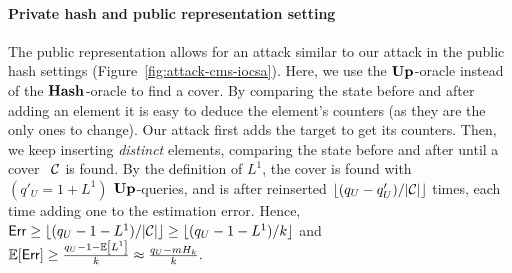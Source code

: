 \paragraph{Private hash and public representation setting}
The public representation allows for an attack similar to our attack in the public hash settings (Figure~\ref{fig:attack-cms-iocsa}). Here, we use the $\textup{\textbf{Up}}\hspace{0.5pt}$-oracle instead of the $\textup{\textbf{Hash}}\hspace{0.5pt}$-oracle to find a cover. By comparing the state before and after adding an element 
it is easy to deduce the element's counters (as they are the only ones to change).
Our attack first adds the target to get its counters. Then, we keep inserting \textit{distinct} elements, comparing the state before and after until a cover ~$\mathcal{C}$ is found.
By the definition of $L^1$, the cover is found with $(q'_U  = 1+ L^1)$ $\textup{\textbf{Up}}\hspace{0.5pt}$-queries, and is after reinserted $\lfloor (q_U - q_U')/|\mathcal{C}| \rfloor$ times, each time adding one to the estimation error. Hence, 
$\mathsf{Err} \geq \lfloor (q_U - 1 - L^1)/|\mathcal{C}|\rfloor \geq \lfloor (q_U -1 - L^1)/k \rfloor$  and
$\mathbb{E}[\mathsf{Err}] \geq \frac{q_U-1-\mathbb{E}\left[L^1\right]}{k} \approx \frac{q_U - mH_k}{k}.$

